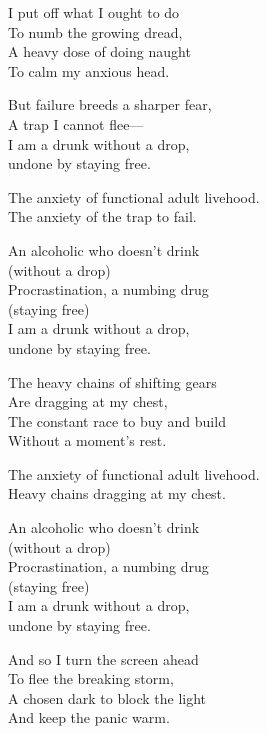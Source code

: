 \begin{lyrics}


I put off what I ought to do\\
To numb the growing dread,\\
A heavy dose of doing naught\\
To calm my anxious head.

But failure breeds a sharper fear,\\
A trap I cannot flee—\\
I am a drunk without a drop,\\
undone by staying free.

The anxiety of functional adult livehood.\\
The anxiety of the trap to fail.

An alcoholic who doesn't drink\\
(without a drop)\\
Procrastination, a numbing drug\\
(staying free)\\
I am a drunk without a drop,\\
undone by staying free.

The heavy chains of shifting gears\\
Are dragging at my chest,\\
The constant race to buy and build\\
Without a moment's rest.

The anxiety of functional adult livehood.\\
Heavy chains dragging at my chest.

An alcoholic who doesn't drink\\
(without a drop)\\
Procrastination, a numbing drug\\
(staying free)\\
I am a drunk without a drop,\\
undone by staying free.

And so I turn the screen ahead\\
To flee the breaking storm,\\
A chosen dark to block the light\\
And keep the panic warm.


\end{lyrics}
